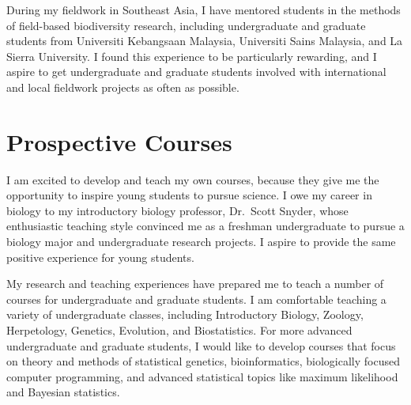 During my fieldwork in Southeast Asia, I have mentored students in the methods
of field-based biodiversity research, including undergraduate and graduate
students from Universiti Kebangsaan Malaysia, Universiti Sains Malaysia, and La
Sierra University.
I found this experience to be particularly rewarding, and I aspire to get
undergraduate and graduate students involved with international and local
fieldwork projects as often as possible.

\section*{Prospective Courses}

I am excited to develop and teach my own courses, because they give me the
opportunity to inspire young students to pursue science.
I owe my career in biology to my introductory biology professor, Dr.\ Scott
Snyder, whose enthusiastic teaching style convinced me as a freshman
undergraduate to pursue a biology major and undergraduate research projects.
I aspire to provide the same positive experience for young students.

My research and teaching experiences have prepared me to teach a number of
courses for undergraduate and graduate students.
I am comfortable teaching a variety of undergraduate classes, including
Introductory Biology, Zoology, Herpetology, Genetics, Evolution, and
Biostatistics.
For more advanced undergraduate and graduate students, I would like to develop
courses that focus on theory and methods of statistical genetics,
bioinformatics, biologically focused computer programming, and advanced
statistical topics like maximum likelihood and Bayesian statistics.

